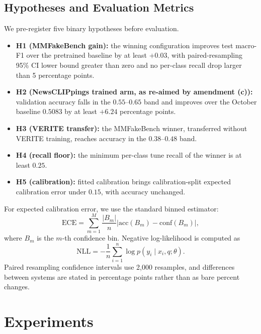 \documentclass{article} %
\begin{document}
\subsection{Hypotheses and Evaluation Metrics}
We pre-register five binary hypotheses before evaluation.
\begin{itemize}
    \item \textbf{H1 (MMFakeBench gain):} the winning configuration improves test macro-F1 over the pretrained baseline by at least \(+0.03\), with paired-resampling 95\% CI lower bound greater than zero and no per-class recall drop larger than 5 percentage points.
    \item \textbf{H2 (NewsCLIPpings trained arm, as re-aimed by amendment (c)):} validation accuracy falls in the \(0.55\)--\(0.65\) band and improves over the October baseline \(0.5083\) by at least \(+6.24\) percentage points.
    \item \textbf{H3 (VERITE transfer):} the MMFakeBench winner, transferred without VERITE training, reaches accuracy in the \(0.38\)--\(0.48\) band.
    \item \textbf{H4 (recall floor):} the minimum per-class tune recall of the winner is at least \(0.25\).
    \item \textbf{H5 (calibration):} fitted calibration brings calibration-split expected calibration error under \(0.15\), with accuracy unchanged.
\end{itemize}

For expected calibration error, we use the standard binned estimator:
\[
\mathrm{ECE}
=
\sum_{m=1}^{M}
\frac{|B_m|}{n}
\left|
\mathrm{acc}(B_m)
-
\mathrm{conf}(B_m)
\right|,
\]
where \(B_m\) is the \(m\)-th confidence bin. Negative log-likelihood is computed as
\[
\mathrm{NLL}
=
-\frac{1}{n}
\sum_{i=1}^n
\log p(y_i\mid x_i,q;\theta).
\]
Paired resampling confidence intervals use 2,000 resamples, and differences between systems are stated in percentage points rather than as bare percent changes.

\section{Experiments}
\label{sec:experiments}
\end{document}
